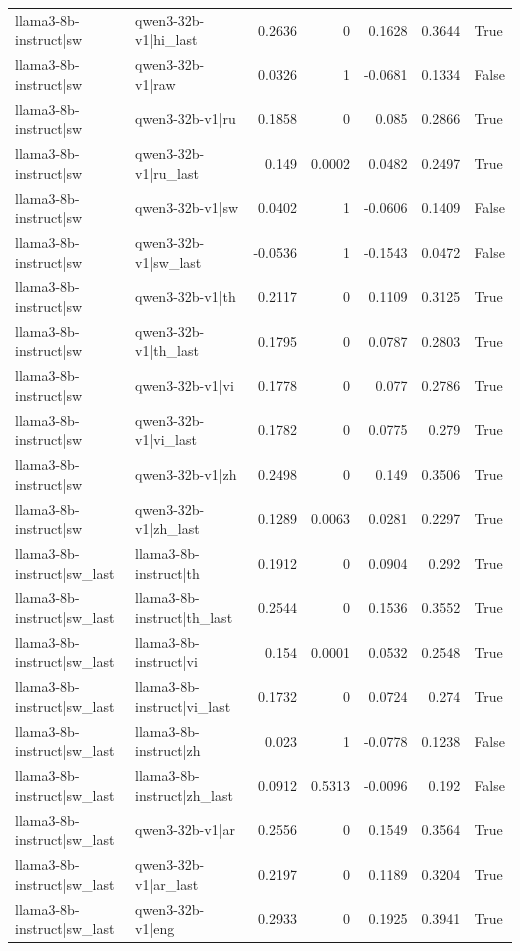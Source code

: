 \begin{table}
\begin{tabular}{l l r r r r l}
llama3-8b-instruct|sw & qwen3-32b-v1|hi_last & 0.2636 & 0 & 0.1628 & 0.3644 & True \\
llama3-8b-instruct|sw & qwen3-32b-v1|raw & 0.0326 & 1 & -0.0681 & 0.1334 & False \\
llama3-8b-instruct|sw & qwen3-32b-v1|ru & 0.1858 & 0 & 0.085 & 0.2866 & True \\
llama3-8b-instruct|sw & qwen3-32b-v1|ru_last & 0.149 & 0.0002 & 0.0482 & 0.2497 & True \\
llama3-8b-instruct|sw & qwen3-32b-v1|sw & 0.0402 & 1 & -0.0606 & 0.1409 & False \\
llama3-8b-instruct|sw & qwen3-32b-v1|sw_last & -0.0536 & 1 & -0.1543 & 0.0472 & False \\
llama3-8b-instruct|sw & qwen3-32b-v1|th & 0.2117 & 0 & 0.1109 & 0.3125 & True \\
llama3-8b-instruct|sw & qwen3-32b-v1|th_last & 0.1795 & 0 & 0.0787 & 0.2803 & True \\
llama3-8b-instruct|sw & qwen3-32b-v1|vi & 0.1778 & 0 & 0.077 & 0.2786 & True \\
llama3-8b-instruct|sw & qwen3-32b-v1|vi_last & 0.1782 & 0 & 0.0775 & 0.279 & True \\
llama3-8b-instruct|sw & qwen3-32b-v1|zh & 0.2498 & 0 & 0.149 & 0.3506 & True \\
llama3-8b-instruct|sw & qwen3-32b-v1|zh_last & 0.1289 & 0.0063 & 0.0281 & 0.2297 & True \\
llama3-8b-instruct|sw_last & llama3-8b-instruct|th & 0.1912 & 0 & 0.0904 & 0.292 & True \\
llama3-8b-instruct|sw_last & llama3-8b-instruct|th_last & 0.2544 & 0 & 0.1536 & 0.3552 & True \\
llama3-8b-instruct|sw_last & llama3-8b-instruct|vi & 0.154 & 0.0001 & 0.0532 & 0.2548 & True \\
llama3-8b-instruct|sw_last & llama3-8b-instruct|vi_last & 0.1732 & 0 & 0.0724 & 0.274 & True \\
llama3-8b-instruct|sw_last & llama3-8b-instruct|zh & 0.023 & 1 & -0.0778 & 0.1238 & False \\
llama3-8b-instruct|sw_last & llama3-8b-instruct|zh_last & 0.0912 & 0.5313 & -0.0096 & 0.192 & False \\
llama3-8b-instruct|sw_last & qwen3-32b-v1|ar & 0.2556 & 0 & 0.1549 & 0.3564 & True \\
llama3-8b-instruct|sw_last & qwen3-32b-v1|ar_last & 0.2197 & 0 & 0.1189 & 0.3204 & True \\
llama3-8b-instruct|sw_last & qwen3-32b-v1|eng & 0.2933 & 0 & 0.1925 & 0.3941 & True \\

\end{tabular}
\end{table}
